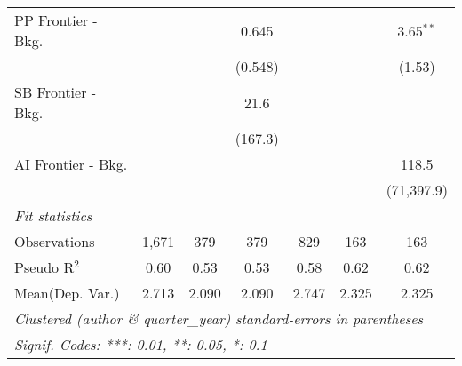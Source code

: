 \begin{tabular}{lcccccc}
   PP Frontier - Bkg.   &         &             & 0.645     &         &              & 3.65$^{**}$\\   
                        &         &             & (0.548)   &         &              & (1.53)\\   
   SB Frontier - Bkg.   &         &             & 21.6      &         &              &   \\   
                        &         &             & (167.3)   &         &              &   \\   
   AI Frontier - Bkg.   &         &             &           &         &              & 118.5\\   
                        &         &             &           &         &              & (71,397.9)\\   
   \midrule
   \emph{Fit statistics}\\
   Observations         & 1,671   & 379         & 379       & 829     & 163          & 163\\  
   Pseudo R$^2$         & 0.60    & 0.53        & 0.53      & 0.58    & 0.62         & 0.62\\  
Mean(Dep. Var.) & 2.713 & 2.090 & 2.090 & 2.747 & 2.325 & 2.325 \\
   \midrule \midrule
   \multicolumn{7}{l}{\emph{Clustered (author \& quarter\_year) standard-errors in parentheses}}\\
   \multicolumn{7}{l}{\emph{Signif. Codes: ***: 0.01, **: 0.05, *: 0.1}}\\
\end{tabular}
\par\endgroup
